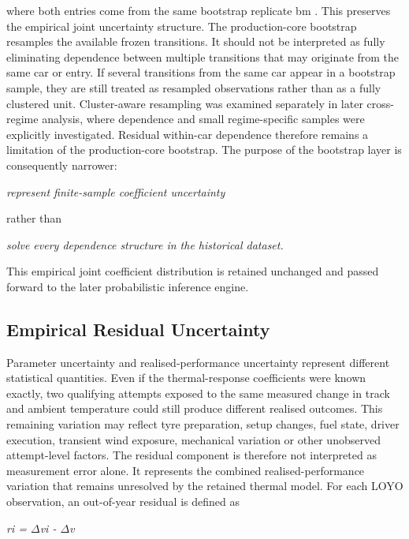 where both entries come from the same bootstrap replicate bm . This preserves the empirical joint uncertainty structure. The production-core bootstrap resamples the available frozen transitions. It should not be interpreted as fully eliminating dependence between multiple transitions that may originate from the same car or entry. If several transitions from the same car appear in a bootstrap sample, they are still treated as resampled observations rather than as a fully clustered unit. Cluster-aware resampling was examined separately in later cross-regime analysis, where dependence and small regime-specific samples were explicitly investigated. Residual within-car dependence therefore remains a limitation of the production-core bootstrap. The purpose of the bootstrap layer is consequently narrower:

\begin{center}\textit{represent finite-sample coefficient uncertainty}\end{center}

rather than

\begin{center}\textit{solve every dependence structure in the historical dataset.}\end{center}

This empirical joint coefficient distribution is retained unchanged and passed forward to the later probabilistic inference engine.

\subsection{Empirical Residual Uncertainty}
Parameter uncertainty and realised-performance uncertainty represent different statistical quantities. Even if the thermal-response coefficients were known exactly, two qualifying attempts exposed to the same measured change in track and ambient temperature could still produce different realised outcomes. This remaining variation may reflect tyre preparation, setup changes, fuel state, driver execution, transient wind exposure, mechanical variation or other unobserved attempt-level factors. The residual component is therefore not interpreted as measurement error alone. It represents the combined realised-performance variation that remains unresolved by the retained thermal model. For each LOYO observation, an out-of-year residual is defined as

\begin{center}\textit{ri = \ensuremath{\Delta}vi - \ensuremath{\Delta}v}\end{center}

